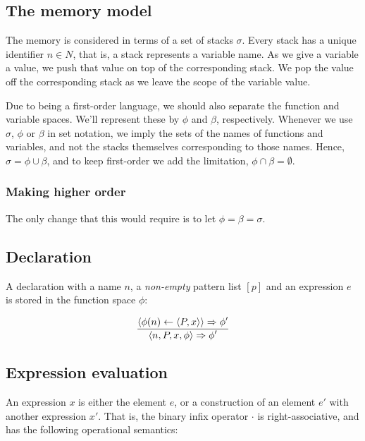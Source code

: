 \subsection{The memory model}\label{section:d-semantics-memory}

The memory is considered in terms of a set of stacks $\sigma$. Every stack has
a unique identifier $n\in N$, that is, a stack represents a variable name. As
we give a variable a value, we push that value on top of the corresponding
stack. We pop the value off the corresponding stack as we leave the scope of
the variable value.

Due to \D{} being a first-order language, we should also separate the function
and variable spaces. We'll represent these by $\phi$ and $\beta$, respectively.
Whenever we use $\sigma$, $\phi$ or $\beta$ in set notation, we imply the sets
of the names of functions and variables, and not the stacks themselves
corresponding to those names.  Hence, $\sigma=\phi\cup\beta$, and to keep \D{}
first-order we add the limitation, $\phi\cap\beta=\emptyset$.

\subsubsection{Making \D{} higher order}

The only change that this would require is to let $\phi=\beta=\sigma$.

\subsection{Declaration}

A declaration with a name $n$, a \emph{non-empty} pattern
list $[p]$ and an expression $e$ is stored in the function space $\phi$:

\begin{equation}\label{sem:declaration}
{\displaystyle
  \left\langle \phi(n)\leftarrow \left\langle P, x\right\rangle\right\rangle
  \Rightarrow
  \phi'
\over\displaystyle
  \left\langle n, P, x, \phi\right\rangle
  \Rightarrow
  \phi'
}
\end{equation}

\subsection{Expression evaluation}

An expression $x$ is either the element $e$, or a construction of an element
$e'$ with another expression $x'$. That is, the binary infix operator $\cdot$
is right-associative, and has the following operational semantics:

